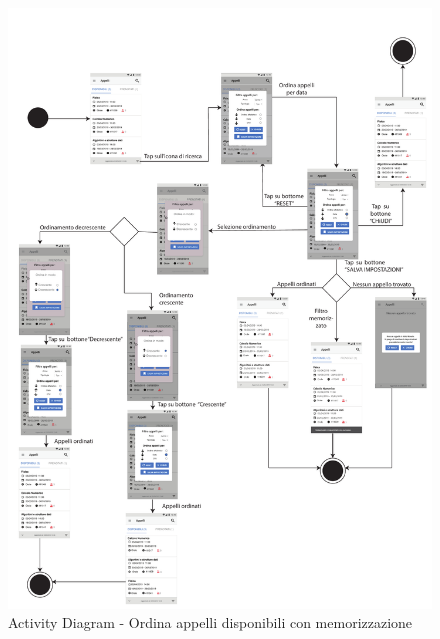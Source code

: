 \begin{figure}
	\centering
	\includegraphics[width=6in]{imgs/gruppo1/activity_diagrams/AD10_ordina_appelli.pdf}
	\caption{Activity Diagram - Ordina appelli disponibili con memorizzazione}
	\label{diag:ordinaAppelliDisponibiliConMemAD}
\end{figure}
\newpage

